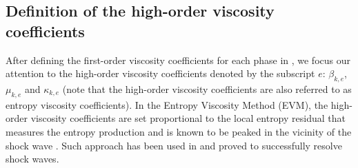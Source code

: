 \documentclass[preprint,10pt]{elsarticle}
\begin{document}
\subsection{Definition of the high-order viscosity coefficients}\label{sec:visc-coeff-ho}
%
After defining the first-order viscosity coefficients for each phase in , we focus our attention to the high-order viscosity coefficients denoted by the subscript $e$: $\beta_{k,e}$, $\mu_{k,e}$ and $\kappa_{k,e}$ (note that the high-order viscosity coefficients are also referred to as entropy viscosity coefficients). In the Entropy Viscosity Method (EVM), the high-order viscosity coefficients are set proportional to the local entropy residual that measures the entropy production and is known to be peaked in the vicinity of the shock wave \cite{Leveque}. Such approach has been used in \cite{jlg1, jlg2, jlg3} and proved to successfully resolve shock waves. 
\end{document}

